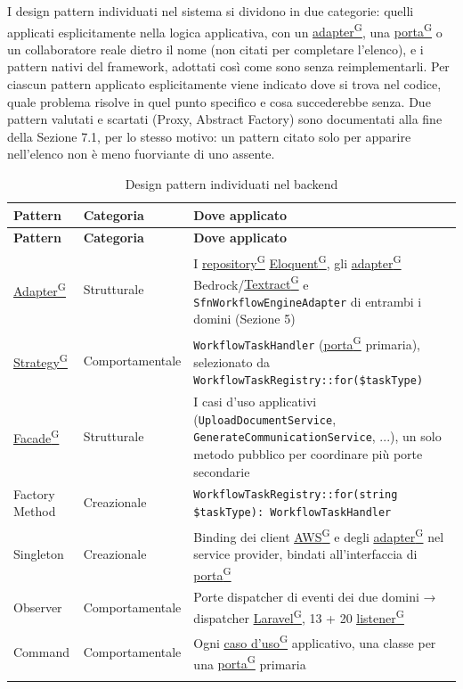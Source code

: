 \documentclass[a4paper,12pt]{article}
\providecommand{\glslink}[2]{\href{https://alittlebyte-19.github.io/Documentazione/glossario.html\#gls-#1}{\underline{#2}\textsuperscript{\scriptsize G}}}
\begin{document}
\begin{sloppypar}

I design pattern individuati nel sistema si dividono in due categorie: quelli applicati esplicitamente nella logica applicativa, con un \glslink{adapter}{adapter}, una \glslink{porta}{porta} o un collaboratore reale dietro il nome (non citati per completare l'elenco), e i pattern nativi del framework, adottati così come sono senza reimplementarli. Per ciascun pattern applicato esplicitamente viene indicato dove si trova nel codice, quale problema risolve in quel punto specifico e cosa succederebbe senza. Due pattern valutati e scartati (Proxy, Abstract Factory) sono documentati alla fine della Sezione 7.1, per lo stesso motivo: un pattern citato solo per apparire nell'elenco non è meno fuorviante di uno assente.

\renewcommand{\arraystretch}{1.3}
{\footnotesize
\setlength{\LTleft}{0pt}
\setlength{\LTright}{0pt}
\setlength{\tabcolsep}{4pt}
\begin{longtable}{|p{2.0cm}|p{2.9cm}|p{10.3cm}|}
    \hline
    \rowcolor{gray!20}
    \textbf{Pattern} & \textbf{Categoria} & \textbf{Dove applicato} \\
    \hline
    \endfirsthead
    \hline
    \rowcolor{gray!20}
    \textbf{Pattern} & \textbf{Categoria} & \textbf{Dove applicato} \\
    \hline
    \endhead
    \glslink{adapter}{Adapter} & Strutturale & I \glslink{repository}{repository} \glslink{eloquent}{Eloquent}, gli \glslink{adapter}{adapter} Bedrock/\glslink{textract}{Textract} e \texttt{SfnWorkflowEngineAdapter} di entrambi i domini (Sezione 5) \\
    \hline
    \glslink{strategy}{Strategy} & Comportamentale & \texttt{WorkflowTaskHandler} (\glslink{porta}{porta} primaria), selezionato da \texttt{WorkflowTaskRegistry::for(\$taskType)} \\
    \hline
    \glslink{facade}{Facade} & Strutturale & I casi d'uso applicativi (\texttt{UploadDocumentService}, \texttt{GenerateCommunicationService}, ...), un solo metodo pubblico per coordinare più porte secondarie \\
    \hline
    Factory Method & Creazionale & \texttt{WorkflowTaskRegistry::for(string \$taskType): WorkflowTaskHandler} \\
    \hline
    Singleton & Creazionale & Binding dei client \glslink{aws}{AWS} e degli \glslink{adapter}{adapter} nel service provider, bindati all'interfaccia di \glslink{porta}{porta} \\
    \hline
    Observer & Comportamentale & Porte dispatcher di eventi dei due domini → dispatcher \glslink{laravel}{Laravel}, 13 + 20 \glslink{listener}{listener} \\
    \hline
    Command & Comportamentale & Ogni \glslink{caso-d-uso-uc}{caso d'uso} applicativo, una classe per una \glslink{porta}{porta} primaria \\
    \hline
    \caption{Design pattern individuati nel backend}
\end{longtable}
}


\end{sloppypar}
\end{document}
